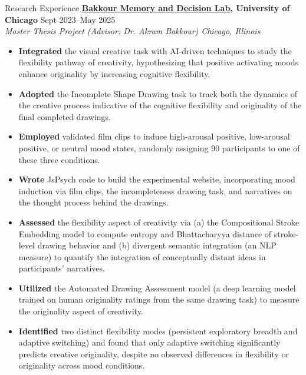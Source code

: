 \documentclass{resume} %
\begin{document}
\begin{rSection}{Research Experience}
\textbf{\href{https://bakkourlab.uchicago.edu/}{Bakkour Memory and Decision Lab}, University of Chicago} \hfill{Sept 2023--May 2025} \\
\textit{Master Thesis Project (Advisor: Dr. Akram Bakkour)} \hfill{\textit{Chicago, Illinois}}
 \begin{itemize}
    \itemsep -5pt {} 
     \item \textbf{Integrated} the visual creative task with AI-driven techniques to study the flexibility pathway of creativity, hypothesizing that positive activating moods enhance originality by increasing cognitive flexibility.
     \item \textbf{Adopted} the Incomplete Shape Drawing task to track both the dynamics of the creative process indicative of the cognitive flexibility and originality of the final completed drawings. 
     \item \textbf{Employed} validated film clips to induce high-arousal positive, low-arousal positive, or neutral mood states, randomly assigning 90 participants to one of these three conditions.
     \item \textbf{Wrote} JsPsych code to build the experimental website, incorporating mood induction via film clips, the incompleteness drawing task, and narratives on the thought process behind the drawings.
     \item \textbf{Assessed} the flexibility aspect of creativity via (a) the Compositional Stroke Embedding model to compute entropy and Bhattacharyya distance of stroke-level drawing behavior and (b) divergent semantic integration (an NLP measure) to quantify the integration of conceptually distant ideas in participants’ narratives.
     \item \textbf{Utilized} the Automated Drawing Assessment model (a deep learning model trained on human originality ratings from the same drawing task) to measure the originality aspect of creativity. 
     \item \textbf{Identified} two distinct flexibility modes (persistent exploratory breadth and adaptive switching) and found that only adaptive switching significantly predicts creative originality, despite no observed differences in flexibility or originality across mood conditions.
 \end{itemize}


\end{rSection}
\end{document}
